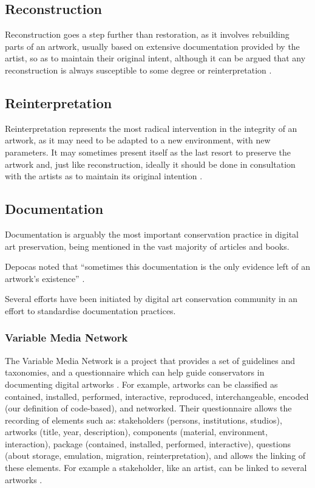 \subsection{Reconstruction}

Reconstruction goes a step further than restoration, as it involves rebuilding parts of an artwork, usually based on extensive documentation provided by the artist, so as to maintain their original intent, although it can be argued that any reconstruction is always susceptible to some degree or reinterpretation \cite{huberNewMediaOld2013}.


\subsection{Reinterpretation}

Reinterpretation represents the most radical intervention in the integrity of an artwork, as it may need to be adapted to a new environment, with new parameters. It may sometimes present itself as the last resort to preserve the artwork and, just like reconstruction, ideally it should be done in consultation with the artists as to maintain its original intention \cite{serexheDigitalArtConservation2013}.


\subsection{Documentation}

Documentation is arguably the most important conservation practice in digital art preservation, being mentioned in the vast majority of articles and books.

Depocas noted that ``sometimes this documentation is the only evidence left of an artwork's existence'' \citeyear[p.145]{depocasDocumentingConservingTechnological2013}.

Several efforts have been initiated by digital art conservation community in an effort to standardise documentation practices.

\subsubsection{Variable Media Network}

The Variable Media Network is a project that provides a set of guidelines and taxonomies, and a questionnaire which can help guide conservators in documenting digital artworks \cite{depocasPermanenceChangeVariable2003}. For example, artworks can be classified as contained, installed, performed, interactive, reproduced, interchangeable, encoded (our definition of code-based), and networked. Their questionnaire allows the recording of elements such as: stakeholders (persons, institutions, studios), artworks (title, year, description), components (material, environment, interaction), package (contained, installed, performed, interactive), questions (about storage, emulation, migration, reinterpretation), and allows the linking of these elements. For example a stakeholder, like an artist, can be linked to several artworks \cite{VariableMediaNetwork}.

